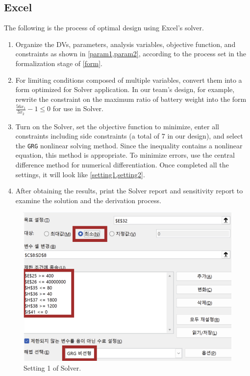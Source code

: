 \documentclass[11pt,twocolumn]{article}
\begin{document}
        \subsection{Excel}
            \label{methodExcel}
            The following is the process of optimal design using Excel's solver.
            \begin{enumerate}
                \item Organize the DVs, parameters, analysis variables, objective function, and constraints as shown in \cref{param1,param2}, according to the process set in the formalization stage of \cref{form}.
                \item For limiting conditions composed of multiple variables, convert them into a form optimized for Solver application. In our team's design, for example, rewrite the constraint on the maximum ratio of battery weight into the form $\frac{56x_1}{3x_2}-1\leq 0$ for use in Solver.
                \item Turn on the Solver, set the objective function to minimize, enter all constraints including side constraints (a total of 7 in our design), and select the \texttt{GRG} nonlinear solving method. Since the inequality contains a nonlinear equation, this method is appropriate. To minimize errors, use the central difference method for numerical differentiation. Once completed all the settings, it will look like \cref{setting1,setting2}.
                \item After obtaining the results, print the Solver report and sensitivity report to examine the solution and the derivation process.
            \end{enumerate}

            \begin{figure}[h]
                \centering
                    \centering
                    \includegraphics[width=.8\columnwidth]{Excel33.png}
                    \caption{Setting 1 of Solver.}
                    \label{setting1}
            \end{figure}
\end{document}

